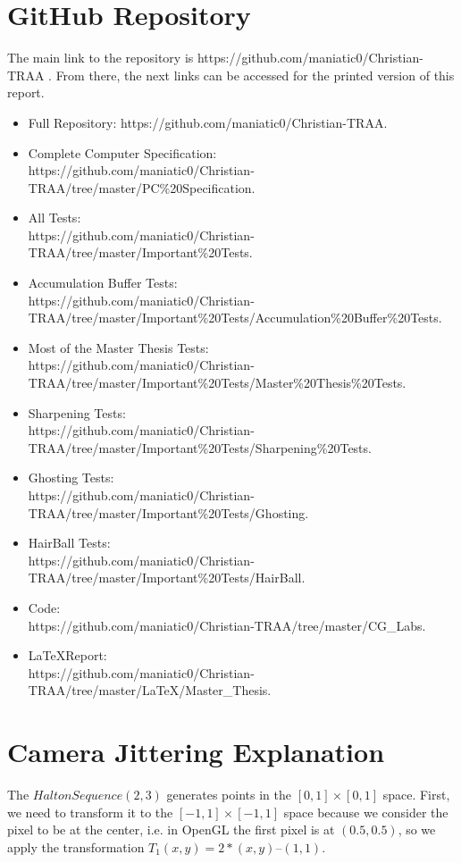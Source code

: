 \documentclass[pregrado]{tesis-usb} %
\begin{document}
\chapter{GitHub Repository}
The main link to the repository is https://github.com/maniatic0/Christian-TRAA . From there, the next links can be accessed for the printed version of this report.
\begin{itemize}
	\item Full Repository: https://github.com/maniatic0/Christian-TRAA.
	\item Complete Computer Specification: \\ https://github.com/maniatic0/Christian-TRAA/tree/master/PC\%20Specification.
	\item All Tests: \\ https://github.com/maniatic0/Christian-TRAA/tree/master/Important\%20Tests.
	\item Accumulation Buffer Tests: \\ https://github.com/maniatic0/Christian-TRAA/tree/master/Important\%20Tests/Accumulation\%20Buffer\%20Tests.
	\item Most of the Master Thesis Tests: \\ https://github.com/maniatic0/Christian-TRAA/tree/master/Important\%20Tests/Master\%20Thesis\%20Tests.
	\item Sharpening Tests: \\ https://github.com/maniatic0/Christian-TRAA/tree/master/Important\%20Tests/Sharpening\%20Tests.
	\item Ghosting Tests: \\ https://github.com/maniatic0/Christian-TRAA/tree/master/Important\%20Tests/Ghosting.
	\item HairBall Tests: \\ https://github.com/maniatic0/Christian-TRAA/tree/master/Important\%20Tests/HairBall.
	\item Code: \\ https://github.com/maniatic0/Christian-TRAA/tree/master/CG\_Labs.
	\item \LaTeX Report: \\ https://github.com/maniatic0/Christian-TRAA/tree/master/LaTeX/Master\_Thesis.
\end{itemize}
\chapter{Camera Jittering Explanation} \label{appendix:jitter}
The $Halton Sequence (2, 3)$ generates points in the $[0,1]\times [0,1]$ space. First, we need to transform it to the $[-1,1]\times [-1,1]$ space because we consider the pixel to be at the center, i.e. in OpenGL the first pixel is at $(0.5, 0.5)$, so we apply the transformation $T_1(x, y) = 2 * (x, y) – (1, 1)$.
\end{document}
